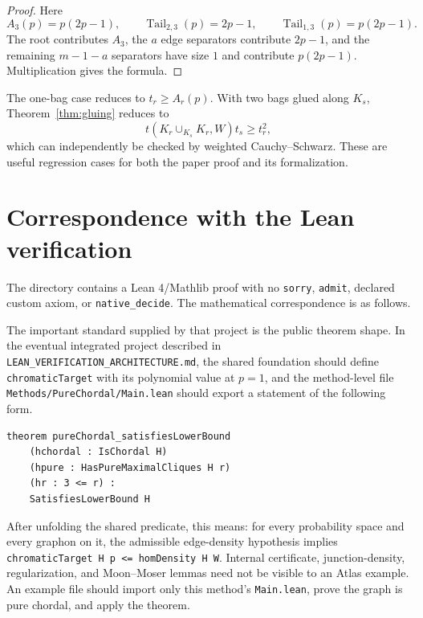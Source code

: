 \documentclass[11pt]{article}
\newcommand{\Tail}{\operatorname{Tail}}
\begin{document}
\begin{proof}
Here
\[
    A_3(p)=p(2p-1),
    \qquad
    \Tail_{2,3}(p)=2p-1,
    \qquad
    \Tail_{1,3}(p)=p(2p-1).
\]
The root contributes \(A_3\), the \(a\) edge separators contribute
\(2p-1\), and the remaining \(m-1-a\) separators have size \(1\) and
contribute \(p(2p-1)\).  Multiplication gives the formula.
\end{proof}

The one-bag case reduces to \(t_r\ge A_r(p)\).  With two bags glued along
\(K_s\), Theorem~\ref{thm:gluing} reduces to
\[
    t(K_r\cup_{K_s}K_r,W)t_s\ge t_r^2,
\]
which can independently be checked by weighted Cauchy--Schwarz.  These are
useful regression cases for both the paper proof and its formalization.

\section{Correspondence with the Lean verification}

The directory  contains a Lean
4/Mathlib proof with
no \texttt{sorry}, \texttt{admit}, declared custom axiom, or
\texttt{native\_decide}.  The mathematical correspondence is as follows.

The important standard supplied by that project is the public theorem shape.
In the eventual integrated project described in
\texttt{LEAN\_VERIFICATION\_ARCHITECTURE.md}, the shared foundation should
define \texttt{chromaticTarget} with its polynomial value at \(p=1\), and the
method-level file \texttt{Methods/PureChordal/Main.lean} should export a
statement of the following form.

\begin{verbatim}
theorem pureChordal_satisfiesLowerBound
    (hchordal : IsChordal H)
    (hpure : HasPureMaximalCliques H r)
    (hr : 3 <= r) :
    SatisfiesLowerBound H
\end{verbatim}

After unfolding the shared predicate, this means: for every probability space
and every graphon on it, the admissible edge-density hypothesis implies
\texttt{chromaticTarget H p <= homDensity H W}.  Internal certificate,
junction-density, regularization, and Moon--Moser lemmas need not be visible to
an Atlas example.  An example file should import only this method's
\texttt{Main.lean}, prove the graph is pure chordal, and apply the theorem.
\end{document}
